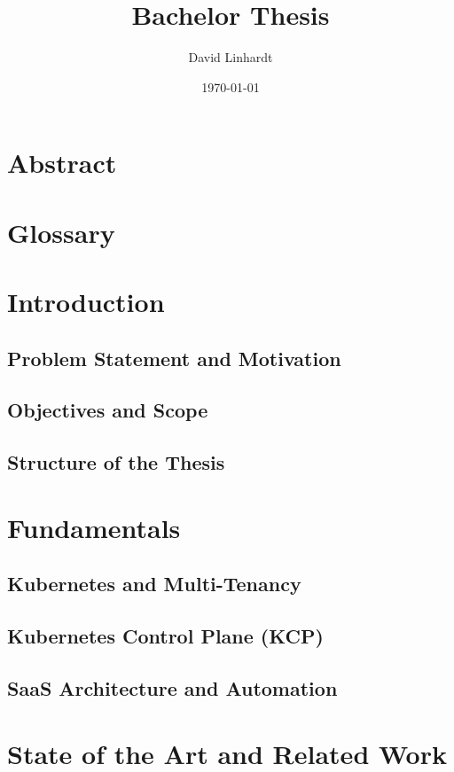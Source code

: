 \documentclass[11pt, a4paper, oneside]{scrartcl}
\title{Bachelor Thesis}
\author{David Linhardt}
\date{\today}
\begin{document}
    \section*{Abstract}

    \tableofcontents

    \section*{Glossary}

    \section{Introduction}

        \subsection{Problem Statement and Motivation}

        \subsection{Objectives and Scope}

        \subsection{Structure of the Thesis}

    \section{Fundamentals}

        \subsection{Kubernetes and Multi-Tenancy}

        \subsection{Kubernetes Control Plane (KCP)}

        \subsection{SaaS Architecture and Automation}

    \section{State of the Art and Related Work}
\end{document}
